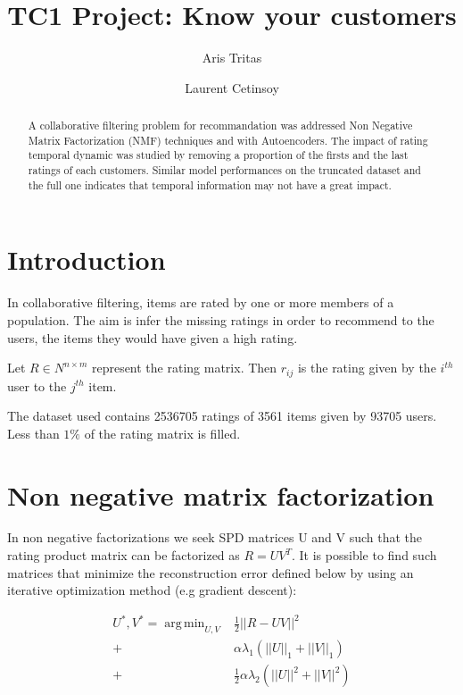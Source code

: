 \documentclass[10pt,twocolumn]{article}
\title{TC1 Project: Know your customers}
\author{Aris Tritas \and Laurent Cetinsoy}
\DeclareMathOperator*{\argmin}{arg\,min}
\begin{document}
\maketitle

\begin{abstract}

A collaborative filtering problem for recommandation was addressed Non Negative Matrix Factorization (NMF) techniques and with Autoencoders. The impact of rating temporal dynamic was studied by removing a proportion of the firsts and the last ratings of each customers. Similar model performances on the truncated dataset and the full one indicates that temporal information may not have a great impact.

\end{abstract}

\section{Introduction}

In collaborative filtering, items are rated by one or more members of a population. The aim is infer the missing ratings in order to recommend to the users, the items they would have given a high rating. 

Let $R \in N^{ n \times m}$ represent the rating matrix. 
Then $r_{ij}$ is the rating given by the $i^{th}$ user to the $j^{th}$ item.


The dataset used contains 2536705 ratings of 3561 items given by 93705 users. Less than  $1\% $ of the rating matrix is filled.



\section{Non negative matrix factorization}

In non negative factorizations we seek SPD matrices U and V such that the rating product matrix can be factorized as $R = UV^T$. It is possible to find such matrices that minimize the reconstruction error defined below by using an iterative optimization method (e.g gradient descent): 

\begin{equation}
\begin{split}
 U^*, V^* = \argmin_{U,V} & \frac{1}{2} ||R - UV||^2 \\
			 + & \alpha \lambda_1 (||U||_1 + ||V||_1) \\
			  + & \frac{1}{2} \alpha \lambda_2  (||U||^2 + ||V||^2) 
\end{split} \label{eq:1}
\end{equation}  
\end{document}
